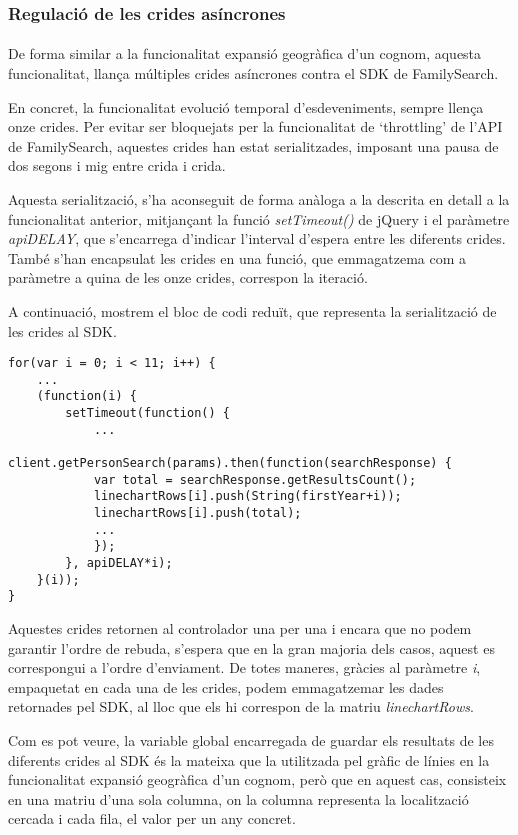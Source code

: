 \subsubsection{Regulació de les crides asíncrones}

\paragraph{}
De forma similar a la funcionalitat expansió geogràfica d’un cognom, aquesta funcionalitat, llança múltiples crides asíncrones contra el SDK de FamilySearch.

En concret, la funcionalitat evolució temporal d'esdeveniments, sempre llença onze crides. Per evitar ser bloquejats per la funcionalitat de `throttling' de l’API de FamilySearch, aquestes crides han estat serialitzades, imposant una pausa de dos segons i mig entre crida i crida.

Aquesta serialització, s'ha aconseguit de forma anàloga a la descrita en detall a la funcionalitat anterior, mitjançant la funció \emph{setTimeout()} de jQuery i el paràmetre \emph{apiDELAY}, que s'encarrega d'indicar l'interval d'espera entre les diferents crides. També s'han encapsulat les crides en una funció, que emmagatzema com a paràmetre a quina de les onze crides, correspon la iteració.

A continuació, mostrem el bloc de codi reduït, que representa la serialització de les crides al SDK.

\begin{lstlisting}[style=rawOwn,caption={Separació manual de les crides asíncrones al SDK}]
for(var i = 0; i < 11; i++) {
    ...
    (function(i) {
        setTimeout(function() {
            ...
            client.getPersonSearch(params).then(function(searchResponse) {
            var total = searchResponse.getResultsCount();
            linechartRows[i].push(String(firstYear+i));
            linechartRows[i].push(total);
            ...
            });
        }, apiDELAY*i);
    }(i));
}
\end{lstlisting}

Aquestes crides retornen al controlador una per una i encara que no podem garantir l'ordre de rebuda, s’espera que en la gran majoria dels casos, aquest es correspongui a l’ordre d’enviament. De totes maneres, gràcies al paràmetre \emph{i}, empaquetat en cada una de les crides, podem emmagatzemar les dades retornades pel SDK, al lloc que els hi correspon de la matriu \emph{linechartRows}.

Com es pot veure, la variable global encarregada de guardar els resultats de les diferents crides al SDK és la mateixa que la utilitzada pel gràfic de línies en la funcionalitat expansió geogràfica d'un cognom, però que en aquest cas, consisteix en una matriu d'una sola columna, on la columna representa la localització cercada i cada fila, el valor per un any concret.

